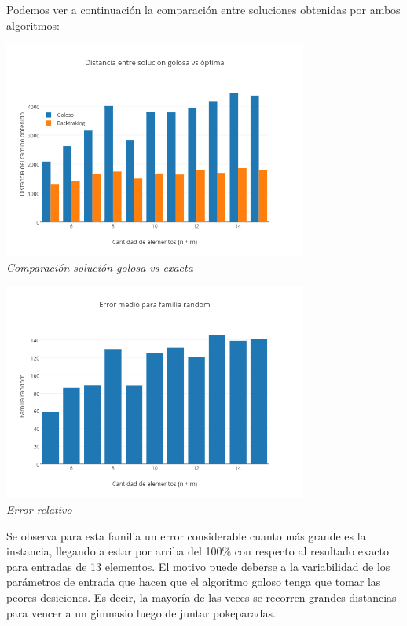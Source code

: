 Podemos ver a continuación la comparación entre soluciones obtenidas por ambos algoritmos:\\
 
\vspace*{0.3cm} \vspace*{0.3cm}
  \begin{center}
 \includegraphics[width=0.75\textwidth]{./EJ2/random.png}
\\{\textit{Comparación solución golosa vs exacta}}
  \end{center}
  
     \vspace*{0.3cm} \vspace*{0.3cm}
  \begin{center}
 \includegraphics[width=0.75\textwidth]{./EJ2/randomError.png}
\\{\textit{Error relativo}}
\end{center}

Se observa para esta familia un error considerable cuanto más grande es la instancia, llegando a estar por arriba del 100\% con respecto al resultado exacto para entradas de 13 elementos. El motivo puede deberse a la variabilidad de los parámetros de entrada que hacen que el algoritmo goloso tenga que tomar las peores desiciones. Es decir, la mayoría de las veces se recorren grandes distancias para vencer a un gimnasio luego de juntar pokeparadas.

